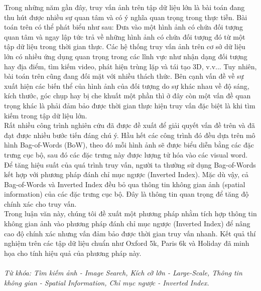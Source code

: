\begin{abstracts}         
Trong những năm gần đây, truy vấn ảnh trên tập dữ liệu lớn là bài toán đang thu hút được nhiều sự quan tâm và có ý nghĩa quan trọng trong thực tiễn. Bài toán trên có thể phát biểu như sau: Đưa vào một hình ảnh có chứa đối tượng quan tâm và ngay lập tức trả về những hình ảnh có chứa đối tượng đó từ một tập dữ liệu trong thời gian thực. Các hệ thống truy vấn ảnh trên cơ sở dữ liệu lớn có nhiều ứng dụng quan trọng trong các lĩnh vực như nhận dạng đối tượng hay địa điểm, tìm kiếm video, phát hiện trùng lặp và tái tạo 3D, v.v... Tuy nhiên, bài toán trên cũng đang đối mặt với nhiều thách thức. Bên cạnh vấn đề về sự xuất hiện các biến thể của hình ảnh của đối tượng do sự khác nhau về độ sáng, kích thước, góc chụp hay bị che khuất một phần thì ở đây còn một vấn đề quan trọng khác là phải đảm bảo được thời gian thực hiện truy vấn đặc biệt là khi tìm kiếm trong tập dữ liệu lớn.\\
Rất nhiều công trình nghiên cứu đã được đề xuất để giải quyết vấn đề trên và đã đạt được nhiều bước tiến đáng chú ý. Hầu hết các công trình đó đều dựa trên mô hình Bag-of-Words (BoW), theo đó mỗi hình ảnh sẽ được biểu diễn bằng các đặc trưng cục bộ, sau đó các đặc trưng này được lượng tử hóa vào các visual word. Để tăng hiệu suất của quá trình truy vấn, người ta thường sử dụng Bag-of-Words kết hợp với phương pháp đánh chỉ mục ngược (Inverted Index). Mặc dù vậy, cả Bag-of-Words và Inverted Index đều bỏ qua thông tin không gian ảnh (spatial information) của các đặc trưng cục bộ. Đây là thông tin quan trọng để tăng độ chính xác cho truy vấn. \\
Trong luận văn này, chúng tôi đề xuất một phương pháp nhằm tích hợp thông tin không gian ảnh vào phương pháp đánh chỉ mục ngược (Inverted Index) để nâng cao độ chính xác nhưng vấn đảm bảo được thời gian truy vấn nhanh. Kết quả thí nghiệm trên các tập dữ liệu chuẩn như Oxford 5k, Paris 6k và Holiday đã minh họa cho tính hiệu quả của phương pháp này.\\
\\
\textit{Từ khóa: Tìm kiếm ảnh - Image Search, Kích cỡ lớn - Large-Scale, Thông tin không gian - Spatial Information, Chỉ mục ngược - Inverted Index.}

\end{abstracts}
 